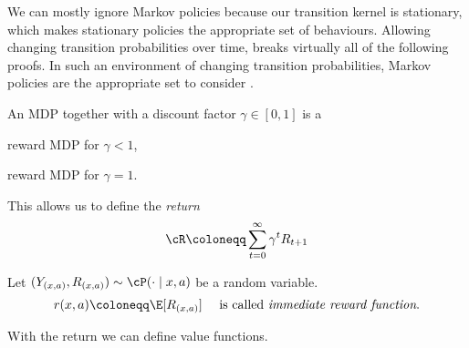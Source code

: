 We can mostly ignore Markov policies because our transition kernel is stationary, which makes stationary policies the appropriate set of behaviours. Allowing changing transition probabilities over time, breaks virtually all of the following proofs. In such an environment of changing transition probabilities, Markov policies are the appropriate set to consider \parencite[c.f.][]{putermanMarkovDecisionProcesses2005}.

\begin{definition}
An MDP together with a discount factor \(\gamma\in[0,1]\) is a
\begin{description}[font=\normalfont, nosep]
	\item[\emph{discounted}] reward MDP for \(\gamma <1 \),
	\item[\emph{undiscounted}] reward MDP for \(\gamma=1 \).
\end{description}
This allows us to define the \emph{return} 
\[\cR\coloneqq\sum_{t=0}^{\infty}\gamma^t R_{t+1}\]
\end{definition}

\begin{definition}
Let \((Y_{(x,a)}, R_{(x,a)})\sim \cP(\cdot\mid x,a) \) be a random variable.
\[r(x,a)\coloneqq \E[R_{(x,a)}] \quad\text{ is called \emph{immediate reward function}.}\]
\end{definition}

With the return we can define value functions.

